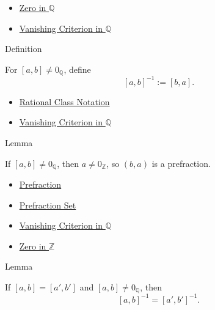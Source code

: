 \begin{dependencies}
\begin{itemize}
  \item \hyperref[def:zero-in-q]{Zero in $\mathbb{Q}$}
  \item \hyperref[lem:vanishing-criterion-q]{Vanishing Criterion in $\mathbb{Q}$}
\end{itemize}
\end{dependencies}

\begin{definitionbox}{Definition}
\begin{definition}
\label{def:reciprocal-on-q-classes}
For $[a,b]\ne 0_{\mathbb{Q}}$, define
\[
[a,b]^{-1}:=[b,a].
\]
\end{definition}
\end{definitionbox}

\begin{dependencies}
\begin{itemize}
  \item \hyperref[def:rational-class-notation]{Rational Class Notation}
  \item \hyperref[lem:vanishing-criterion-q]{Vanishing Criterion in $\mathbb{Q}$}
\end{itemize}
\end{dependencies}

\begin{lemmabox}{Lemma}
\begin{lemma}
\label{lem:reciprocal-denominator-nonzero-q}
If $[a,b]\ne 0_{\mathbb{Q}}$, then $a\ne 0_{\mathbb{Z}}$, so $(b,a)$ is a
prefraction.
\end{lemma}
\end{lemmabox}

\begin{dependencies}
\begin{itemize}
  \item \hyperref[def:prefraction]{Prefraction}
  \item \hyperref[def:prefraction-set]{Prefraction Set}
  \item \hyperref[lem:vanishing-criterion-q]{Vanishing Criterion in $\mathbb{Q}$}
  \item \hyperref[def:zero-in-z]{Zero in $\mathbb{Z}$}
\end{itemize}
\end{dependencies}

\begin{lemmabox}{Lemma}
\begin{lemma}
\label{lem:reciprocal-on-q-respects-equivalence}
If $[a,b]=[a',b']$ and $[a,b]\ne 0_{\mathbb{Q}}$, then
\[
[a,b]^{-1}=[a',b']^{-1}.
\]
\end{lemma}
\end{lemmabox}

